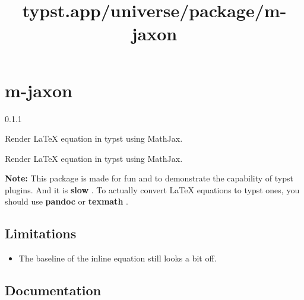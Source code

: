 \title{typst.app/universe/package/m-jaxon}

\label{banner}
\section{m-jaxon}\label{m-jaxon}

{ 0.1.1 }

Render LaTeX equation in typst using MathJax.

\label{readme}
Render LaTeX equation in typst using MathJax.

\textbf{Note:} This package is made for fun and to demonstrate the
capability of typst plugins. And it is \textbf{slow} . To actually
convert LaTeX equations to typst ones, you should use \textbf{pandoc} or
\textbf{texmath} .

\pandocbounded{}

\begin{Shaded}
\begin{Highlighting}[]




\end{Highlighting}
\end{Shaded}

\subsection{Limitations}\label{limitations}

\begin{itemize}
\tightlist
\item
  The baseline of the inline equation still looks a bit off.
\end{itemize}

\subsection{Documentation}\label{documentation}


